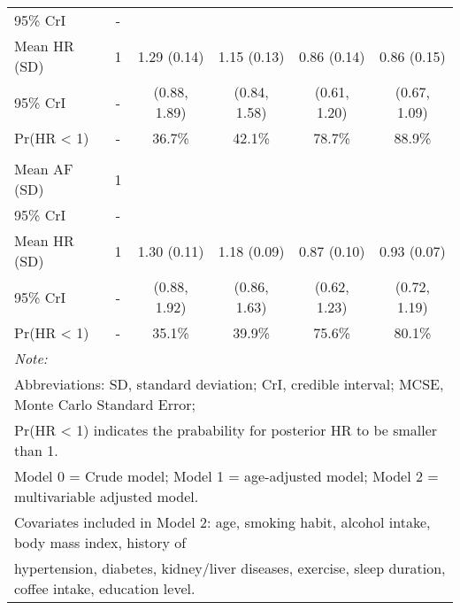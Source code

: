 \documentclass[nutrients,article,submit,moreauthors,pdftex]{mdpi}
\begin{document}
\begin{table}[!h]
{\begin{tabular}[t]{lccccc}
\hspace{1em}95\% CrI & - &  &  &  \vphantom{1} & \\
\rowcolor{gray!6}  \hspace{1em}Mean HR (SD) & 1 & 1.29 (0.14) & 1.15 (0.13) & 0.86 (0.14) & 0.86 (0.15)\\
\hspace{1em}95\% CrI & - & (0.88, 1.89) & (0.84, 1.58) & (0.61, 1.20) & (0.67, 1.09)\\
\rowcolor{gray!6}  \hspace{1em}Pr(HR < 1) & - & 36.7\% & 42.1\% & 78.7\% & 88.9\%\\
\addlinespace[0.3em]
\multicolumn{6}{l}{\textbf{Model 2}}\\
\hspace{1em}Mean AF (SD) & 1 &  &  &  & \\
\rowcolor{gray!6}  \hspace{1em}95\% CrI & - &  &  &  & \\
\hspace{1em}Mean HR (SD) & 1 & 1.30 (0.11) & 1.18 (0.09) & 0.87 (0.10) & 0.93 (0.07)\\
\rowcolor{gray!6}  \hspace{1em}95\% CrI & - & (0.88, 1.92) & (0.86, 1.63) & (0.62, 1.23) & (0.72, 1.19)\\
\hspace{1em}Pr(HR < 1) & - & 35.1\% & 39.9\% & 75.6\% & 80.1\%\\
\bottomrule
\multicolumn{6}{l}{\textit{Note: }}\\
\multicolumn{6}{l}{Abbreviations: SD, standard deviation; CrI, credible interval; MCSE, Monte Carlo Standard Error;}\\
\multicolumn{6}{l}{ Pr(HR < 1) indicates the prabability for posterior HR to be smaller than 1.}\\
\multicolumn{6}{l}{Model 0 = Crude model; Model 1 = age-adjusted model; Model 2 = multivariable adjusted model.}\\
\multicolumn{6}{l}{Covariates included in Model 2: age, smoking habit, alcohol intake, body mass index, history of}\\
\multicolumn{6}{l}{hypertension, diabetes, kidney/liver diseases, exercise, sleep duration, coffee intake, education level.}\\
\end{tabular}}
\end{table}

%
\end{document}
